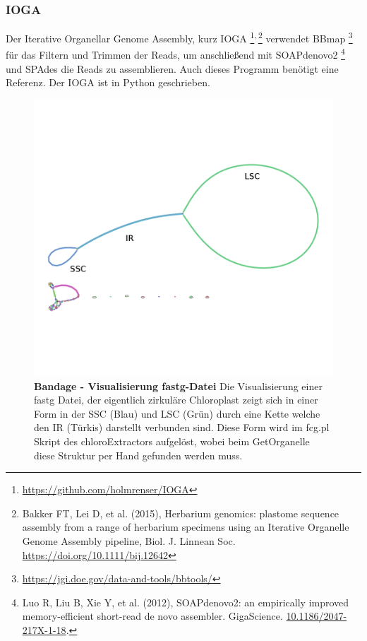 \documentclass{scrartcl}
\begin{document}
\subsubsection{IOGA}
\label{sec-2-5-6}
Der Iterative Organellar Genome Assembly, kurz IOGA \footnote{\url{https://github.com/holmrenser/IOGA}}\textsuperscript{,}\,\footnote{Bakker FT, Lei D, et al. (2015), Herbarium genomics: plastome sequence assembly from a range of herbarium specimens using an Iterative Organelle Genome Assembly pipeline, Biol. J. Linnean Soc. \url{https://doi.org/10.1111/bij.12642}} verwendet BBmap \footnote{\url{https://jgi.doe.gov/data-and-tools/bbtools/}} für das Filtern und Trimmen der Reads, um anschließend mit 
SOAPdenovo2 \footnote{Luo R, Liu B, Xie Y, et al. (2012), SOAPdenovo2: an empirically improved memory-efficient short-read de novo assembler. GigaScience.  \url{10.1186/2047-217X-1-18}.} und SPAdes \footnotemark[23]{} die Reads zu assemblieren. 
Auch dieses Programm benötigt eine Referenz. Der IOGA ist in Python geschrieben.
\begin{figure}
\includegraphics[width=.9\linewidth]{./graphCE_SRR1945473_1.png}
\caption[Bandage - Visualisierung fastg-Datei]{\textbf{Bandage - Visualisierung fastg-Datei} Die Visualisierung einer fastg Datei, der eigentlich zirkuläre Chloroplast zeigt sich in einer Form in der SSC (Blau) und LSC (Grün) durch eine Kette welche den IR (Türkis) darstellt verbunden sind. Diese Form wird im fcg.pl Skript des chloroExtractors aufgelöst, wobei beim GetOrganelle diese Struktur per Hand gefunden werden muss.}
\end{figure}
\end{document}
